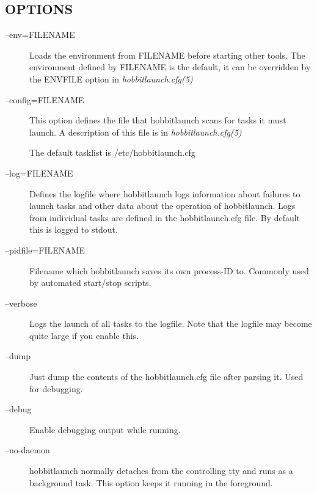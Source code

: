 \subsection{OPTIONS}
\begin{description}
\item[--env=FILENAME] Loads the environment from FILENAME before
  starting other tools. The environment defined by FILENAME is the
  default, it can be overridden by the ENVFILE option in
  \emph{hobbitlaunch.cfg(5)}



 

\item[--config=FILENAME] This option defines the file that
  hobbitlaunch scans for tasks it must launch. A description of this
  file is in \emph{hobbitlaunch.cfg(5)}

 The default tasklist is /etc/hobbitlaunch.cfg 

 

\item[--log=FILENAME] Defines the logfile where hobbitlaunch logs
  information about failures to launch tasks and other data about the
  operation of hobbitlaunch. Logs from individual tasks are defined in
  the hobbitlaunch.cfg file. By default this is logged to stdout. 


 

\item[--pidfile=FILENAME] Filename which hobbitlaunch saves its own process-ID to. Commonly used by automated start/stop scripts. 

 

\item[--verbose] Logs the launch of all tasks to the logfile. Note that the logfile may become quite large if you enable this. 

 

\item[--dump] Just dump the contents of the hobbitlaunch.cfg file after parsing it. Used for debugging. 

 

\item[--debug] Enable debugging output while running. 

 

\item[--no-daemon] hobbitlaunch normally detaches from the controlling
  tty and runs as a background task. This option keeps it running in
  the foreground. 


 

\end{description}

